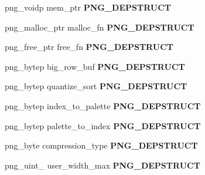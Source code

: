 \begin{DoxyCompactItemize}
\item 
png\+\_\+voidp mem\+\_\+ptr {\bfseries P\+N\+G\+\_\+\+D\+E\+P\+S\+T\+R\+U\+CT}\hypertarget{structpng__struct__def_abd744f5ad3c910a8a76fa4bed411fbe3}{}\label{structpng__struct__def_abd744f5ad3c910a8a76fa4bed411fbe3}

\item 
png\+\_\+malloc\+\_\+ptr malloc\+\_\+fn {\bfseries P\+N\+G\+\_\+\+D\+E\+P\+S\+T\+R\+U\+CT}\hypertarget{structpng__struct__def_a7e20a9bc74a66cdcf372ecb0d568bbf9}{}\label{structpng__struct__def_a7e20a9bc74a66cdcf372ecb0d568bbf9}

\item 
png\+\_\+free\+\_\+ptr free\+\_\+fn {\bfseries P\+N\+G\+\_\+\+D\+E\+P\+S\+T\+R\+U\+CT}\hypertarget{structpng__struct__def_ac5f9e88287ca9a998096c176898c65aa}{}\label{structpng__struct__def_ac5f9e88287ca9a998096c176898c65aa}

\item 
png\+\_\+bytep big\+\_\+row\+\_\+buf {\bfseries P\+N\+G\+\_\+\+D\+E\+P\+S\+T\+R\+U\+CT}\hypertarget{structpng__struct__def_aa9b91853a306e36765e314b68fe5c401}{}\label{structpng__struct__def_aa9b91853a306e36765e314b68fe5c401}

\item 
png\+\_\+bytep quantize\+\_\+sort {\bfseries P\+N\+G\+\_\+\+D\+E\+P\+S\+T\+R\+U\+CT}\hypertarget{structpng__struct__def_a79b7c84d49597ea51b41b781675de528}{}\label{structpng__struct__def_a79b7c84d49597ea51b41b781675de528}

\item 
png\+\_\+bytep index\+\_\+to\+\_\+palette {\bfseries P\+N\+G\+\_\+\+D\+E\+P\+S\+T\+R\+U\+CT}\hypertarget{structpng__struct__def_afc12eee42cc64c8b6b83b3ea5454b312}{}\label{structpng__struct__def_afc12eee42cc64c8b6b83b3ea5454b312}

\item 
png\+\_\+bytep palette\+\_\+to\+\_\+index {\bfseries P\+N\+G\+\_\+\+D\+E\+P\+S\+T\+R\+U\+CT}\hypertarget{structpng__struct__def_a034c157ce22db4f88f65ea32556027d8}{}\label{structpng__struct__def_a034c157ce22db4f88f65ea32556027d8}

\item 
png\+\_\+byte compression\+\_\+type {\bfseries P\+N\+G\+\_\+\+D\+E\+P\+S\+T\+R\+U\+CT}\hypertarget{structpng__struct__def_afec49b002c2f40308d3cb21ee0a26811}{}\label{structpng__struct__def_afec49b002c2f40308d3cb21ee0a26811}

\item 
png\+\_\+uint\+\_ user\+\_\+width\+\_\+max {\bfseries P\+N\+G\+\_\+\+D\+E\+P\+S\+T\+R\+U\+CT}\hypertarget{structpng__struct__def_af95d866277206268927bea2ef8d9be33}{}\label{structpng__struct__def_af95d866277206268927bea2ef8d9be33}


\end{DoxyCompactItemize}
